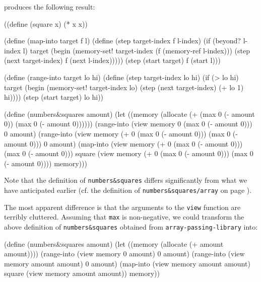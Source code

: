 produces the following result:

\begin{Snippet}
((define (square x)
   (* x x))
\end{Snippet}
\begin{Snippet} 
 (define (map-into target f l)
   (define (step target-index f l-index)
     (if (beyond? l-index l)
       target
       (begin
         (memory-set!
           target-index
           (f (memory-ref l-index)))
         (step (next target-index) f (next l-index)))))
   (step (start target) f (start l)))
\end{Snippet}
\begin{Snippet}
 (define (range-into target lo hi)
   (define (step target-index lo hi)
     (if (> lo hi)
       target
       (begin
         (memory-set! target-index lo)
         (step (next target-index) (+ lo 1) hi))))
   (step (start target) lo hi))
\end{Snippet}
\begin{Snippet}
 (define (numbers&squares amount)
   (let ((memory (allocate (+ (max 0 (- amount 0))
			      (max 0 (- amount 0))))))
     (range-into (view memory 0 (max 0 (- amount 0)))
		 0 amount)
     (range-into (view memory (+ 0 (max 0 (- amount 0)))
		       (max 0 (- amount 0)))
		 0 amount)
     (map-into (view memory (+ 0 (max 0 (- amount 0)))
		     (max 0 (- amount 0)))
	       square
	       (view memory (+ 0 (max 0 (- amount 0)))
		     (max 0 (- amount 0))))
     memory)))
\end{Snippet}

Note that the definition of \texttt{numbers\&squares} differs significantly
from what we have anticipated earlier (cf. the definition of
\texttt{numbers\&squares\-/array} on page \pageref{numbers-and-squares-array}).

The most apparent difference is that the arguments to the \texttt{view} function
are terribly cluttered. Assuming that \texttt{max} is non-negative, we could
transform the above definition of \texttt{numbers\&squares} obtained from
\texttt{array\--passing\--library} into:

\begin{Snippet}
(define (numbers&squares amount)
  (let ((memory (allocate (+ amount amount))))
    (range-into (view memory 0 amount) 0 amount)
    (range-into (view memory amount amount) 0 amount)
    (map-into (view memory amount amount)
              square
              (view memory amount amount))
    memory))
\end{Snippet}

